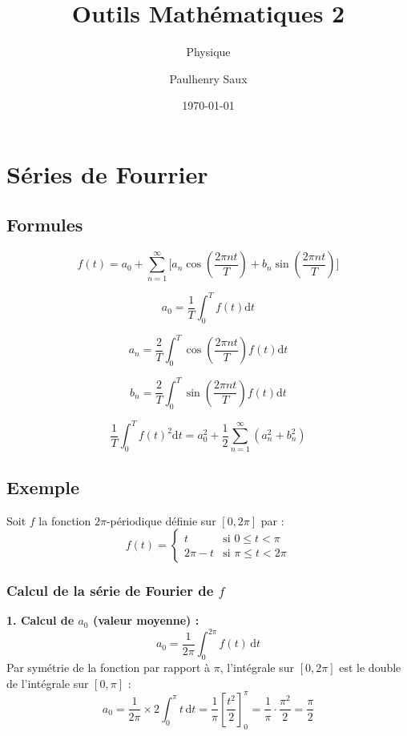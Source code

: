 \documentclass[french]{yLectureNote}
\title{Outils Mathématiques 2}
\subtitle{Physique}
\author{Paulhenry Saux}
\date{\today}
\newcommand{\dd}{\mathrm{d}}
\begin{document}
\setcounter{chapter}{3}
\chapter{Séries de Fourrier }
\section{Formules}
\begin{theorem}
 \[f(t) = a_0+\sum_{n=1}^{\infty}\big[a_n \cos(\frac{2\pi nt}{T})+b_n \sin(\frac{2\pi nt}{T})\big]\]
\end{theorem}
\begin{theorem}[Coefficient \(a_0\)]
 \[a_0 = \frac{1}{T} \int_0^{T}f(t)\dd t\]
\end{theorem}
\begin{theorem}[Coefficient \(a_n\)]
 \[a_n = \frac{2}{T} \int_{0}^T \cos(\frac{2\pi nt}{T})f(t)\dd t\]
\end{theorem}
\begin{theorem}[Coefficient \(b_n\)]
 \[b_n = \frac{2}{T} \int_{0}^T \sin(\frac{2\pi nt}{T})f(t)\dd t\]
\end{theorem}
\begin{theorem}
 \[\frac{1}{T} \int_0^T f(t)^2\dd t = a_0^2 + \frac12 \sum_{n=1}^{\infty} (a_n^2+b_n^2)\]
\end{theorem}
\section{Exemple}
Soit $f$ la fonction $2\pi$-périodique définie sur $[0, 2\pi]$ par :
\[
f(t) = \begin{cases}
t & \text{si } 0 \le t < \pi \\
2\pi - t & \text{si } \pi \le t < 2\pi
\end{cases}
\]

\subsection{Calcul de la série de Fourier de $f$}

\textbf{1. Calcul de $a_0$ (valeur moyenne) :}
\[
a_0 = \frac{1}{2\pi} \int_{0}^{2\pi} f(t) \, \dd t
\]
Par symétrie de la fonction par rapport à $\pi$, l'intégrale sur $[0, 2\pi]$ est le double de l'intégrale sur $[0, \pi]$ :
\[
a_0 = \frac{1}{2\pi} \times 2 \int_{0}^{\pi} t \, \dd t = \frac{1}{\pi} \left[ \frac{t^2}{2} \right]_0^\pi = \frac{1}{\pi} \cdot \frac{\pi^2}{2} = \frac{\pi}{2}
\]
\end{document}
